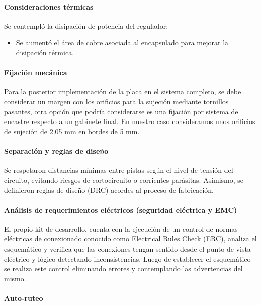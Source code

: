\documentclass[]{article}
\begin{document}
	
	\paragraph{Consideraciones térmicas}
	Se contempló la disipación de potencia del regulador:
	\begin{itemize}
		\item Se aumentó el área de cobre asociada al encapsulado para mejorar la disipación térmica.
	\end{itemize}
	
	\paragraph{Fijación mecánica }
	
	Para la posterior implementación de la placa en el sistema completo, se debe considerar un margen con los orificios para la sujeción mediante tornillos pasantes, otra opción que podría considerarse es una fijación por sistema de encastre respecto a un gabinete final. En nuestro caso consideramos unos orificios de sujeción de 2.05 mm en bordes de 5 mm.

	
	\paragraph{Separación y reglas de diseño}
	Se respetaron distancias mínimas entre pistas según el nivel de tensión del circuito, evitando riesgos de cortocircuito o corrientes parásitas. Asimismo, se definieron reglas de diseño (DRC) acordes al proceso de fabricación.
	
	\paragraph{Análisis de requerimientos eléctricos (seguridad eléctrica y EMC)}
	
	El propio kit de desarrollo, cuenta con la ejecución de un control de normas eléctricas de conexionado conocido como Electrical Rules Check (ERC), analiza el esquemático y verifica que las conexiones tengan sentido desde el punto de vista eléctrico y lógico detectando inconsistencias. Luego de establecer el esquemático se realiza este control eliminando errores y contemplando las advertencias del mismo.
	
	\paragraph{Auto-ruteo}
	
\end{document}
